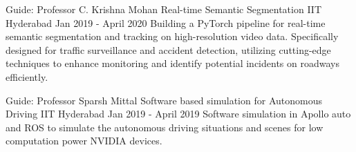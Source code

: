 

\begin{cventries}
\vspace{-1mm}

  \cventry
    {Guide: Professor C. Krishna Mohan} %
    {Real-time Semantic Segmentation} %
    {IIT Hyderabad} %
    {Jan 2019 - April 2020} %
    {
      Building a PyTorch pipeline for real-time semantic segmentation and tracking on high-resolution video data. Specifically designed for traffic surveillance and accident detection, utilizing cutting-edge techniques to enhance monitoring and identify potential incidents on roadways efficiently.
    }

  \cventry
    {Guide: Professor Sparsh Mittal} %
    {Software based simulation for Autonomous Driving} %
    {IIT Hyderabad} %
    {Jan 2019 - April 2019} %
    {
      Software simulation in Apollo auto and ROS to simulate the autonomous driving situations and scenes for low computation power NVIDIA devices.
    }


\end{cventries}

\vspace{-2mm}